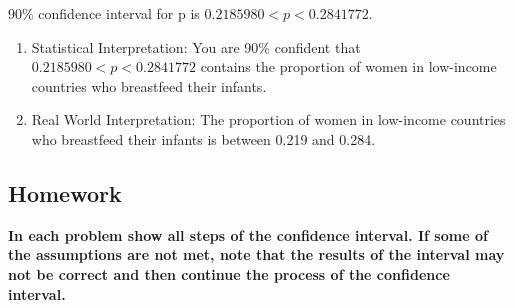 \documentclass[
]{book}
\begin{document}
90\% confidence interval for p is \(0.2185980<p<0.2841772\).

\begin{enumerate}
\def\labelenumi{\arabic{enumi}.}
\setcounter{enumi}{3}
\item
  Statistical Interpretation: You are 90\% confident that \(0.2185980<p<0.2841772\) contains the proportion of women in low-income countries who breastfeed their infants.
\item
  Real World Interpretation: The proportion of women in low-income countries who breastfeed their infants is between 0.219 and 0.284.
\end{enumerate}

\hypertarget{homework-1}{%
\subsection{Homework}\label{homework-1}}

\textbf{In each problem show all steps of the confidence interval. If some of the assumptions are not met, note that the results of the interval may not be correct and then continue the process of the confidence interval.}
\end{document}
